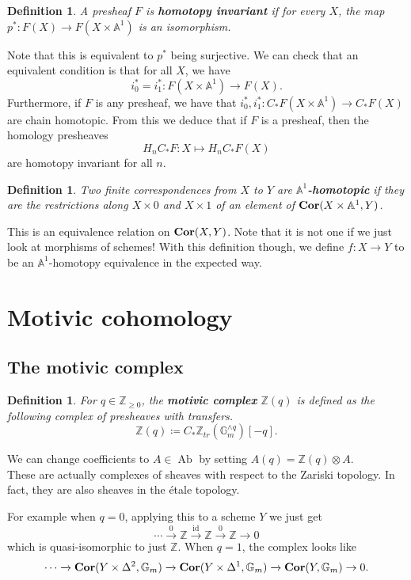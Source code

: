 \documentclass[a4paper, 11pt]{article} %
\newtheorem{definition}[theorem]{Definition}
\theoremstyle{remark}
\newcommand{\?}{{\color{red} ???}}
\newcommand{\mb}{\mathbb}
\newcommand{\Z}{\mb{Z}}
\newcommand{\A}{\mb{A}}
\newcommand{\G}{\mb{G}}
\newcommand{\catname}[1]{{\normalfont\textbf{#1}}}
\newcommand{\Cor}{\catname{Cor}}
\DeclareMathOperator{\id}{id}
\DeclareMathOperator{\Ab}{Ab}
\begin{document}
\begin{definition}
A presheaf $F$ is \textbf{homotopy invariant} if for every $X$, the map $p^*:F(X)\rightarrow F(X\times \A^1)$ is an isomorphism.
\end{definition}

Note that this is equivalent to $p^*$ being surjective.  We can check that an equivalent condition is that for all $X$, we have 
\[
i_0^*=i_1^*:F(X\times \A^1)\rightarrow F(X).
\]
Furthermore, if $F$ is any presheaf, we have that $i_0^*, i_1^*:C_*F(X\times \A^1)\rightarrow C_*F(X)$ are chain homotopic.  From this we deduce that if $F$ is a presheaf, then the homology presheaves 
\[
H_nC_*F:X\mapsto H_nC_*F(X)
\]
are homotopy invariant for all $n$. 

\begin{definition}
Two finite correspondences from $X$ to $Y$ are \textbf{$\A^1$-homotopic} if they are the restrictions along $X\times 0$ and $X\times 1$ of an element of $\Cor(X\times \A^1, Y)$. 
\end{definition}

This is an equivalence relation on $\Cor(X, Y)$.  Note that it is not one if we just look at morphisms of schemes!  With this definition though, we define $f:X\rightarrow Y$ to be an $\A^1$-homotopy equivalence in the expected way.


\section{Motivic cohomology} 

\subsection{The motivic complex}

\begin{definition}
For $q\in \Z_{\ge 0}$, the \textbf{motivic complex} $\Z(q)$ is defined as the following complex of presheaves with transfers. 
\[
\Z(q)\coloneqq C_*\Z_{tr}(\G_m^{\wedge q})[-q].
\]
\end{definition}

We can change coefficients to $A\in \Ab$ by setting $A(q)=\Z(q)\otimes A$.  \\  

These are actually complexes of sheaves with respect to the Zariski topology.  In fact, they are also sheaves in the \'etale topology.  

For example when $q=0$, applying this to a scheme $Y$ we just get 
\[
\cdots\xrightarrow{0} \Z\xrightarrow{\id} \Z\xrightarrow{0}\Z\rightarrow 0 
\]
which is quasi-isomorphic to just $\Z$.  When $q=1$, the complex looks like 
\[
\cdots\xrightarrow{} \Cor(Y\times\Delta^2, \G_m) \xrightarrow{} \Cor(Y\times\Delta^1, \G_m)\xrightarrow{}\Cor(Y, \G_m)\rightarrow 0.
\]
\end{document}
